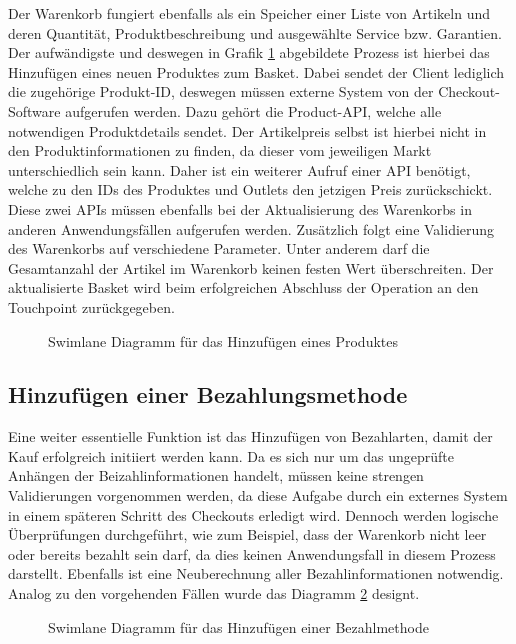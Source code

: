 Der Warenkorb fungiert ebenfalls als ein Speicher einer Liste von Artikeln und deren Quantität, Produktbeschreibung und ausgewählte Service bzw. Garantien. Der aufwändigste und deswegen in Grafik \ref{fig:SL-AddProduct} abgebildete Prozess ist hierbei das Hinzufügen eines neuen Produktes zum Basket. Dabei sendet der Client lediglich die zugehörige Produkt-ID, deswegen müssen externe System von der Checkout-Software aufgerufen werden. Dazu gehört die Product-API, welche alle notwendigen Produktdetails sendet. Der Artikelpreis selbst ist hierbei nicht in den Produktinformationen zu finden, da dieser vom jeweiligen Markt unterschiedlich sein kann. Daher ist ein weiterer Aufruf einer API benötigt, welche zu den IDs des Produktes und Outlets den jetzigen Preis zurückschickt. Diese zwei APIs müssen ebenfalls bei der Aktualisierung des Warenkorbs in anderen Anwendungsfällen aufgerufen werden. Zusätzlich folgt eine Validierung des Warenkorbs auf verschiedene Parameter. Unter anderem darf die Gesamtanzahl der Artikel im Warenkorb keinen festen Wert überschreiten. Der aktualisierte Basket wird beim erfolgreichen Abschluss der Operation an den Touchpoint zurückgegeben.

\begin{figure}[htbp]
	\centering
	
	\caption{Swimlane Diagramm für das Hinzufügen eines Produktes }
	\label{fig:SL-AddProduct}
\end{figure}

\subsection{Hinzufügen einer Bezahlungsmethode}

Eine weiter essentielle Funktion ist das Hinzufügen von Bezahlarten, damit der Kauf erfolgreich initiiert werden kann.  Da es sich nur um das ungeprüfte Anhängen der Beizahlinformationen handelt, müssen keine strengen Validierungen vorgenommen werden, da diese Aufgabe durch ein externes System in einem späteren Schritt des Checkouts erledigt wird. Dennoch werden logische Überprüfungen durchgeführt, wie zum Beispiel, dass der Warenkorb nicht leer oder bereits bezahlt sein darf, da dies keinen Anwendungsfall in diesem Prozess darstellt. Ebenfalls ist eine Neuberechnung aller Bezahlinformationen notwendig. Analog zu den vorgehenden Fällen wurde das Diagramm \ref{fig:SL-PutBezahlmethode} designt.

\begin{figure}[htbp]
	\centering
	
	\caption{Swimlane Diagramm für das Hinzufügen einer Bezahlmethode}
	\label{fig:SL-PutBezahlmethode}
\end{figure}

